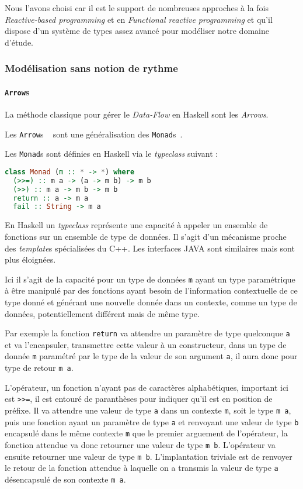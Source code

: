 \documentclass{llncs}
\newcommand{\DF}{\emph{Data-Flow} }
\newcommand{\RP}{\emph{Reactive-based programming} }
\newcommand{\FRP}{\emph{Functional reactive programming} }
\newcommand{\Arrs}{\texttt{Arrow}s }
\begin{document}
Nous l'avons choisi car il est le support de nombreuses approches à la fois \RP
et en \FRP et qu'il dispose d'un système de types assez avancé pour modéliser
notre domaine d'étude.

\subsubsection{Modélisation sans notion de rythme}
\paragraph{\Arrs}
La méthode classique pour gérer le \DF en Haskell sont les \emph{Arrows}.

Les \Arrs~\cite{Hughes00} sont une généralisation des \texttt{Monad}s~\cite{Wadler90}.

Les \texttt{Monad}s sont définies en Haskell via le \emph{typeclass} suivant :
\begin{lstlisting}[language=haskell]
class Monad (m :: * -> *) where
  (>>=) :: m a -> (a -> m b) -> m b
  (>>) :: m a -> m b -> m b
  return :: a -> m a
  fail :: String -> m a
\end{lstlisting}

En Haskell un \emph{typeclass} représente une capacité à appeler un ensemble
de fonctions sur un ensemble de type de données.
Il s'agit d'un mécanisme proche des \emph{template}s spécialisées du C++.
Les interfaces JAVA sont similaires mais sont plus éloignées.

Ici il s'agit de la capacité pour un type de données \texttt{m} ayant un type
paramétrique à être manipulé par des fonctions ayant besoin de l'information
contextuelle de ce type donné et générant une nouvelle donnée dans un contexte,
comme un type de données, potentiellement différent mais de même type.

Par exemple la fonction \texttt{return} va attendre un paramètre de type quelconque
\texttt{a} et va l'encapsuler, transmettre cette valeur à un constructeur, dans
un type de donnée \texttt{m} paramétré par le type de la valeur de son argument
\texttt{a}, il aura donc pour type de retour \texttt{m a}.

L'opérateur, un fonction n'ayant pas de caractères alphabétiques, important ici
est \texttt{>>=}, il est entouré de paranthèses pour indiquer qu'il est en
position de préfixe.
Il va attendre une valeur de type \texttt{a} dans un contexte \texttt{m}, soit
le type \texttt{m a}, puis une fonction ayant un paramètre de type \texttt{a}
et renvoyant une valeur de type \texttt{b} encapsulé dans le même contexte \texttt{m}
que le premier arguement de l'opérateur, la fonction attendue va donc retourner
une valeur de type \texttt{m b}. L'opérateur va ensuite retourner une valeur de
type \texttt{m b}.
L'implantation triviale est de renvoyer le retour de la fonction attendue à
laquelle on a transmis la valeur de type \texttt{a} désencapsulé de son contexte
\texttt{m a}.
\end{document}
